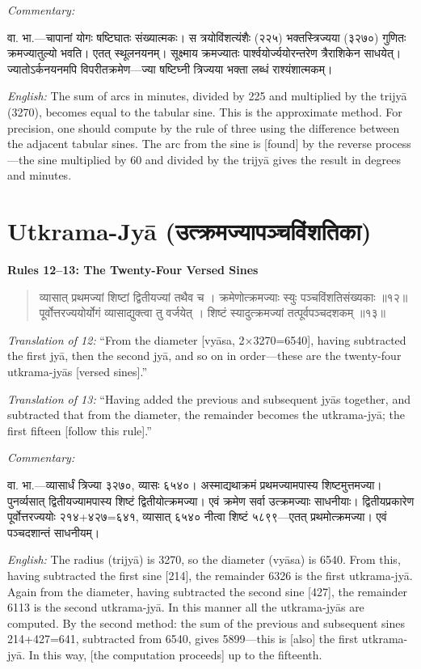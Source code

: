 \documentclass[11pt,a4paper]{book}
\newcommand{\dev}[1]{{\devanagarifont #1}}
\newenvironment{shloka}{%
  \begin{verse}
  \devanagarifont\color{versecolor}%
}{\end{verse}}
\newenvironment{vasaanaskt}{%
  \par\vspace{0.5em}\noindent\small\textit{Commentary:}%
}{\par\vspace{0.5em}}
\newcommand{\ruleheading}[1]{%
  \par\vspace{0.8em}\noindent\textbf{\color{sectioncolor}#1}\par\vspace{0.3em}%
}
\begin{document}
\begin{vasaanaskt}
\dev{वा. भा.}---चापानां योगः षष्टिघातः संख्यात्मकः। स त्रयोविंशत्यंशैः (२२५) भक्तस्त्रिज्यया (३२७०) गुणितः क्रमज्यातुल्यो भवति। एतत् स्थूलनयनम्। सूक्ष्माय क्रमज्यातः पार्श्वयोर्ज्ययोरन्तरेण त्रैराशिकेन साधयेत्। ज्यातोऽर्कनयनमपि विपरीतक्रमेण---ज्या षष्टिघ्नी त्रिज्यया भक्ता लब्धं राश्यंशात्मकम्।

\textit{English:} The sum of arcs in minutes, divided by 225 and multiplied by the trijyā (3270), becomes equal to the tabular sine. This is the approximate method. For precision, one should compute by the rule of three using the difference between the adjacent tabular sines. The arc from the sine is [found] by the reverse process---the sine multiplied by 60 and divided by the trijyā gives the result in degrees and minutes.
\end{vasaanaskt}

\section{Utkrama-Jyā (\dev{उत्क्रमज्यापञ्चविंशतिका})}

\ruleheading{Rules 12--13: The Twenty-Four Versed Sines}

\begin{shloka}
\begin{altverse}
\dev{व्यासात् प्रथमज्यां शिष्टां द्वितीयज्यां तथैव च ।}
\dev{क्रमेणोत्क्रमज्याः स्युः पञ्चविंशतिसंख्यकाः ॥१२॥}
\dev{पूर्वोत्तरज्ययोर्योगं व्यासाद्युक्त्वा तु वर्जयेत् ।}
\dev{शिष्टं स्यादुत्क्रमज्यां तत्पूर्वपञ्चदशकम् ॥१३॥}
\end{altverse}
\end{shloka}

\textit{Translation of 12:} ``From the diameter [vyāsa, 2×3270=6540], having subtracted the first jyā, then the second jyā, and so on in order---these are the twenty-four utkrama-jyās [versed sines].''

\textit{Translation of 13:} ``Having added the previous and subsequent jyās together, and subtracted that from the diameter, the remainder becomes the utkrama-jyā; the first fifteen [follow this rule].''

\begin{vasaanaskt}
\dev{वा. भा.}---व्यासार्धं त्रिज्या ३२७०, व्यासः ६५४०। अस्माद्यथाक्रमं प्रथमज्यामपास्य शिष्टमुत्तमज्या। पुनर्व्यसात् द्वितीयज्यामपास्य शिष्टं द्वितीयोत्क्रमज्या। एवं क्रमेण सर्वा उत्क्रमज्याः साधनीयाः। द्वितीयप्रकारेण पूर्वोत्तरज्ययोः २१४+४२७=६४१, व्यासात् ६५४० नीत्वा शिष्टं ५८९९---एतत् प्रथमोत्क्रमज्या। एवं पञ्चदशान्तं साधनीयम्।

\textit{English:} The radius (trijyā) is 3270, so the diameter (vyāsa) is 6540. From this, having subtracted the first sine [214], the remainder 6326 is the first utkrama-jyā. Again from the diameter, having subtracted the second sine [427], the remainder 6113 is the second utkrama-jyā. In this manner all the utkrama-jyās are computed. By the second method: the sum of the previous and subsequent sines 214+427=641, subtracted from 6540, gives 5899---this is [also] the first utkrama-jyā. In this way, [the computation proceeds] up to the fifteenth.
\end{vasaanaskt}
\end{document}
